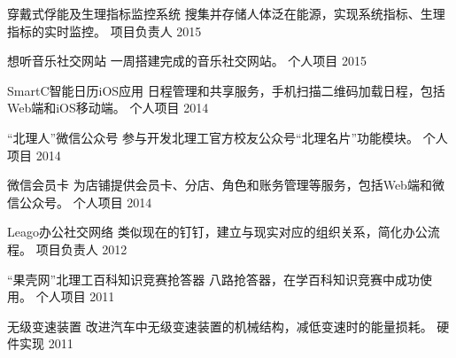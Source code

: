 \begin{cventries}
\begin{cvhonors}
\cvhonor
{穿戴式俘能及生理指标监控系统} %
{搜集并存储人体泛在能源，实现系统指标、生理指标的实时监控。} %
{项目负责人} %
{2015} %

\cvhonor
{想听音乐社交网站} %
{一周搭建完成的音乐社交网站。} %
{个人项目} %
{2015} %

\cvhonor
{SmartC智能日历iOS应用} %
{日程管理和共享服务，手机扫描二维码加载日程，包括Web端和iOS移动端。} %
{个人项目} %
{2014} %

\cvhonor
{“北理人”微信公众号} %
{参与开发北理工官方校友公众号“北理名片”功能模块。} %
{个人项目} %
{2014} %

\cvhonor
{微信会员卡} %
{为店铺提供会员卡、分店、角色和账务管理等服务，包括Web端和微信公众号。} %
{个人项目} %
{2014} %

\cvhonor
{Leago办公社交网络} %
{类似现在的钉钉，建立与现实对应的组织关系，简化办公流程。} %
{项目负责人} %
{2012} %

\cvhonor
{“果壳网”北理工百科知识竞赛抢答器} %
{八路抢答器，在学百科知识竞赛中成功使用。} %
{个人项目} %
{2011} %

\cvhonor
{无级变速装置} %
{改进汽车中无级变速装置的机械结构，减低变速时的能量损耗。} %
{硬件实现} %
{2011} %

\end{cvhonors}


\end{cventries}